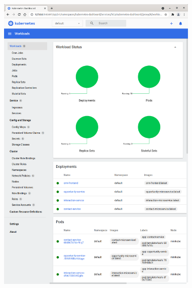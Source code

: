 \begin{figure}[H] 
    \centering
    \includegraphics[width=0.855\textwidth]{figures/MinikubeDashboard.png}
\end{figure}